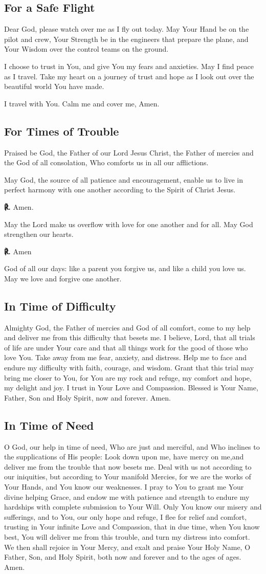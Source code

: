 \documentclass[12pt]{article}
\makeatletter
\newcommand{\prayertitle}[1]{\subsection{#1}}
\newcommand{\response}{{\setmainfont{Times New Roman}\textbf{℟.}}\xspace}
\DeclareRobustCommand{\response}{\textbf{\vers@resp{0pt}{R}.}\xspace}
\newcommand{\vers@resp@sym}{\raisebox{0.2ex}{\rotatebox[origin=c]{-20}{$\m@th\rceil$}}}
\newcommand{\vers@resp}[2]{%
		{\ooalign{\hidewidth\kern#1\vers@resp@sym\hidewidth\cr#2\cr}}%
	}
\makeatother
\begin{document}
\prayertitle{For a Safe Flight}
Dear God, please watch over me as I fly out today.
May Your Hand be on the pilot and crew, Your Strength be in the engineers that prepare the plane, and Your Wisdom over the control teams on the ground.

I choose to trust in You, and give You my fears and anxieties.
May I find peace as I travel.
Take my heart on a journey of trust and hope as I look out over the beautiful world You have made.

I travel with You.
Calm me and cover me,
Amen.

\prayertitle{For Times of Trouble}
\label{prayer:times_of_trouble}
Praised be God, the Father of our Lord Jesus Christ, the Father of mercies and the God of all consolation, Who comforts us in all our afflictions.

May God, the source of all patience and encouragement, enable us to live in perfect harmony with one another according to the Spirit of Christ Jesus.

\response Amen.

May the Lord make us overflow with love for one another and for all.
May God strengthen our hearts.

\response Amen

God of all our days: like a parent you forgive us, and like a child you love us.
May we love and forgive one another.

\prayertitle{In Time of Difficulty}
Almighty God, the Father of mercies and God of all comfort, come to my help and deliver me from this difficulty that besets me.
I believe, Lord, that all trials of life are under Your care and that all things work for the good of those who love You.
Take away from me fear, anxiety, and distress.
Help me to face and endure my difficulty with faith, courage, and wisdom.
Grant that this trial may bring me closer to You, for You are my rock and refuge, my comfort and hope, my delight and joy.
I trust in Your Love and Compassion.
Blessed is Your Name, Father, Son and Holy Spirit, now and forever. Amen.

\prayertitle{In Time of Need}
O God, our help in time of need, Who are just and merciful, and Who inclines to the supplications of His people:
Look down upon me, have mercy on me,and deliver me from the trouble that now besets me.
Deal with us not according to our iniquities, but according to Your manifold Mercies, for we are the works of Your Hands, and You know our weaknesses.
I pray to You to grant me Your divine helping Grace, and endow me with patience and strength to endure my hardships with complete submission to Your Will.
Only You know our misery and sufferings, and to You, our only hope and refuge, I flee for relief and comfort, trusting in Your infinite Love and Compassion, that in due time, when You know best, You will deliver me from this trouble, and turn my distress into comfort.
We then shall rejoice in Your Mercy, and exalt and praise Your Holy Name, O Father, Son, and Holy Spirit, both now and forever and to the ages of ages.
Amen.
\end{document}
